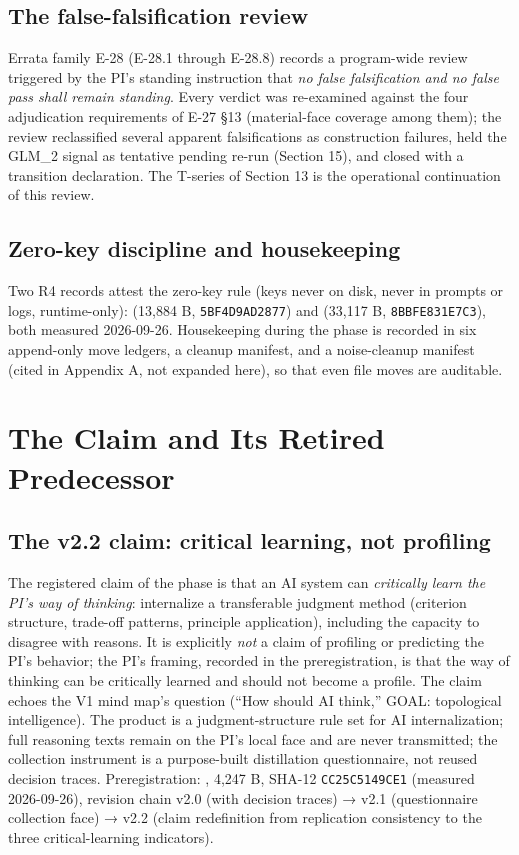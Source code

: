 \documentclass[11pt]{article}
\newcommand{\sha}[1]{\texttt{#1}}
\begin{document}
\subsection{The false-falsification review}
\noindent Errata family E-28 (E-28.1 through E-28.8) records a program-wide review triggered by the PI's standing instruction that \emph{no false falsification and no false pass shall remain standing}. Every verdict was re-examined against the four adjudication requirements of E-27 §13 (material-face coverage among them); the review reclassified several apparent falsifications as construction failures, held the GLM\_2 signal as tentative pending re-run (Section 15), and closed with a transition declaration. The T-series of Section 13 is the operational continuation of this review.\par
\subsection{Zero-key discipline and housekeeping}
\noindent Two R4 records attest the zero-key rule (keys never on disk, never in prompts or logs, runtime-only):  (13,884 B, \sha{5BF4D9AD2877}) and  (33,117 B, \sha{8BBFE831E7C3}), both measured 2026-09-26. Housekeeping during the phase is recorded in six append-only move ledgers, a cleanup manifest, and a noise-cleanup manifest (cited in Appendix A, not expanded here), so that even file moves are auditable.\par
\section{The Claim and Its Retired Predecessor}
\label{sec:11}
\subsection{The v2.2 claim: critical learning, not profiling}
\noindent The registered claim of the phase is that an AI system can \emph{critically learn the PI's way of thinking}: internalize a transferable judgment method (criterion structure, trade-off patterns, principle application), including the capacity to disagree with reasons. It is explicitly \emph{not} a claim of profiling or predicting the PI's behavior; the PI's framing, recorded in the preregistration, is that the way of thinking can be critically learned and should not become a profile. The claim echoes the V1 mind map's question (``How should AI think,'' GOAL: topological intelligence). The product is a judgment-structure rule set for AI internalization; full reasoning texts remain on the PI's local face and are never transmitted; the collection instrument is a purpose-built distillation questionnaire, not reused decision traces. Preregistration: , 4,247 B, SHA-12 \sha{CC25C5149CE1} (measured 2026-09-26), revision chain v2.0 (with decision traces) → v2.1 (questionnaire collection face) → v2.2 (claim redefinition from replication consistency to the three critical-learning indicators).\par
\end{document}
